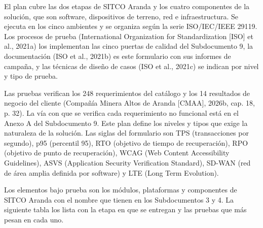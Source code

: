 \documentclass[formulario]{../../comun/overfore}
\begin{document}
El plan cubre las dos etapas de SITCO Aranda y los cuatro componentes de la solución, que son software, dispositivos de terreno, red e infraestructura. Se ejecuta en los cinco ambientes y se organiza según la serie ISO/IEC/IEEE 29119. Los procesos de prueba (International Organization for Standardization [ISO] et al., 2021a) los implementan las cinco puertas de calidad del Subdocumento 9, la documentación (ISO et al., 2021b) es este formulario con sus informes de campaña, y las técnicas de diseño de casos (ISO et al., 2021c) se indican por nivel y tipo de prueba.

Las pruebas verifican los 248 requerimientos del catálogo y los 14 resultados de negocio del cliente (Compañía Minera Altos de Aranda [CMAA], 2026b, cap. 18, p. 32). La vía con que se verifica cada requerimiento no funcional está en el Anexo A del Subdocumento 9. Este plan define los niveles y tipos que exige la naturaleza de la solución. Las siglas del formulario son TPS (transacciones por segundo), p95 (percentil 95), RTO (objetivo de tiempo de recuperación), RPO (objetivo de punto de recuperación), WCAG (Web Content Accessibility Guidelines), ASVS (Application Security Verification Standard), SD-WAN (red de área amplia definida por software) y LTE (Long Term Evolution).

Los elementos bajo prueba son los módulos, plataformas y componentes de SITCO Aranda con el nombre que tienen en los Subdocumentos 3 y 4. La siguiente tabla los lista con la etapa en que se entregan y las pruebas que más pesan en cada uno.
\end{document}
